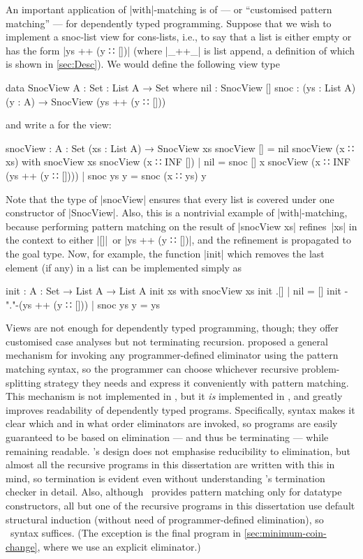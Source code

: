 An important application of |with|-matching is  of  --- or ``customised pattern matching'' --- for dependently typed programming.
Suppose that we wish to implement a snoc-list view for cons-lists, i.e., to say that a list is either empty or has the form |ys ++ (y ∷ [])| (where |_++_| is list append, a definition of which is shown in \autoref{sec:Desc}).
We would define the following view type
\begin{code}
data SnocView {A : Set} : List A → Set where
  nil   : SnocView []
  snoc  : (ys : List A) (y : A) → SnocView (ys ++ (y ∷ []))
\end{code}
and write a  for the view:
\begin{code}
snocView : {A : Set} (xs : List A) → SnocView xs
snocView [] = nil
snocView (x ∷ xs)                    with snocView xs
snocView (x ∷ INF [])                | nil        = snoc [] x
snocView (x ∷ INF (ys ++ (y ∷ [])))  | snoc ys y  = snoc (x ∷ ys) y
\end{code}
Note that the type of |snocView| ensures that every list is covered under one constructor of |SnocView|.
Also, this is a nontrivial example of |with|-matching, because performing pattern matching on the result of |snocView xs| refines~|xs| in the context to either |[]|~or |ys ++ (y ∷ [])|, and the refinement is propagated to the goal type.
Now, for example, the function |init| which removes the last element (if any) in a list can be implemented simply as
\begin{code}
init : {A : Set} → List A → List A
init xs                       with snocView xs
init .[]                      | nil        = []
init {-"."-}(ys ++ (y ∷ []))  | snoc ys y  = ys
\end{code}

Views are not enough for dependently typed programming, though; they offer customised case analyses but not terminating recursion.
\citet{McBride-view} proposed a general mechanism for invoking any programmer-defined eliminator using the pattern matching syntax, so the programmer can choose whichever recursive problem-splitting strategy they needs and express it conveniently with pattern matching.
This mechanism is not implemented in \Agda, but it \emph{is} implemented in , and greatly improves readability of dependently typed programs.
Specifically,  syntax makes it clear which and in what order eliminators are invoked, so programs are easily guaranteed to be based on elimination --- and thus be terminating --- while remaining readable.
\Agda's design does not emphasise reducibility to elimination, but almost all the recursive programs in this dissertation are written with this in mind, so termination is evident even without understanding \Agda's termination checker in detail.
Also, although \Agda\ provides pattern matching only for datatype constructors, all but one of the recursive programs in this dissertation use default structural induction (without need of programmer-defined elimination), so \Agda\ syntax suffices.
(The exception is the final program in \autoref{sec:minimum-coin-change}, where we use an explicit eliminator.)


